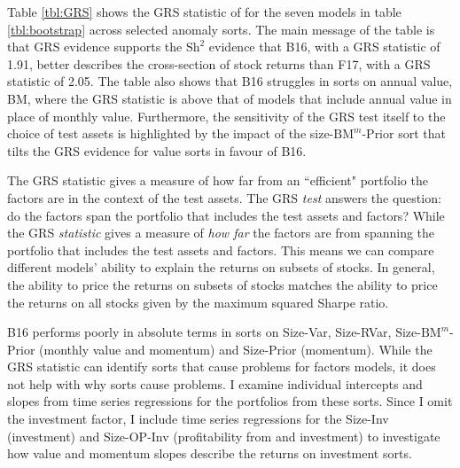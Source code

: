 
Table \ref{tbl:GRS} shows the GRS statistic of \textcite{gibbons1989test} for the seven
models in table \ref{tbl:bootstrap} across selected anomaly sorts. The main message of the
table is that GRS evidence supports the $\text{Sh}^2$ evidence that B16, with a GRS
statistic of 1.91, better describes the cross-section of stock returns than F17,  with a
GRS statistic of 2.05. The table also shows that B16 struggles in sorts on annual value,
BM, where the GRS statistic is above that of models that include annual value in place of
monthly value. Furthermore, the sensitivity of the GRS test itself to the choice of test
assets is highlighted by the impact of the size-$\text{BM}^m$-Prior sort that tilts the
GRS evidence for value sorts in favour of B16.

The GRS statistic gives a measure of how far from an ``efficient" portfolio the factors
are in the context of the test assets. The GRS \emph{test} answers the question: do the
factors span the portfolio that includes the test assets and factors? While the GRS
\emph{statistic} gives a measure of \emph{how far} the factors are from spanning the
portfolio that includes the test assets and factors. This means we can compare different
models' ability to explain the returns on subsets of stocks. In general, the ability to
price the returns on subsets of stocks matches the ability to price the returns on all
stocks given by the maximum squared Sharpe ratio.

B16 performs poorly in absolute terms in sorts on Size-Var, Size-RVar,
Size-$\text{BM}^m$-Prior (monthly value and momentum) and Size-Prior (momentum). While the
GRS statistic can identify sorts that cause problems for factors models, it does not help
with why sorts cause problems. I examine individual intercepts and slopes from time series
regressions for the portfolios from these sorts. Since I omit the investment factor, I
include time series regressions for the Size-Inv (investment) and Size-OP-Inv
(profitability from \textcite{fama2006profitability} and investment) to investigate how
value and momentum slopes describe the returns on investment sorts.
